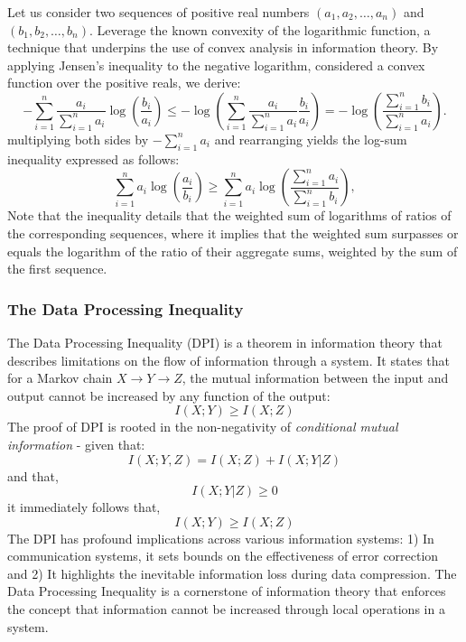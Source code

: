 \documentclass[12pt]{article}
\begin{document}
		Let us consider two sequences of positive real numbers \((a_1, a_2, \ldots, a_n)\) and \((b_1, b_2, \ldots, b_n)\). Leverage the known convexity of the logarithmic function, a technique that underpins the use of convex analysis in information theory. By applying Jensen's inequality to the negative logarithm, considered a convex function over the positive reals, we derive:
		\begin{equation}
			-\sum_{i=1}^{n} \frac{a_i}{\sum_{i=1}^{n} a_i} \log\left(\frac{b_i}{a_i}\right) \leq -\log\left(\sum_{i=1}^{n} \frac{a_i}{\sum_{i=1}^{n} a_i} \frac{b_i}{a_i}\right) = -\log\left(\frac{\sum_{i=1}^{n} b_i}{\sum_{i=1}^{n} a_i}\right).
		\end{equation}
		multiplying both sides by \(-\sum_{i=1}^{n} a_i \) and rearranging yields the log-sum inequality expressed as follows:
		\begin{equation}
			\sum_{i=1}^{n} a_i \log\left(\frac{a_i}{b_i}\right) \geq  \sum_{i=1}^{n} a_i \log\left(\frac{ \sum_{i=1}^{n} a_i}{ \sum_{i=1}^{n} b_i}\right),
		\end{equation}
		Note that the inequality details that the weighted sum of logarithms of ratios of the corresponding sequences, where it implies that the weighted sum surpasses or equals the logarithm of the ratio of their aggregate sums, weighted by the sum of the first sequence. 
		\subsubsection{The Data Processing Inequality}
		The Data Processing Inequality (DPI) is a  theorem in information theory that describes limitations on the flow of information through a system. It states that for a Markov chain \(X \rightarrow Y \rightarrow Z\), the mutual information between the input and output cannot be increased by any function of the output:
		\[ I(X; Y) \geq I(X; Z) \]
		The proof of DPI is rooted in the non-negativity of \emph{conditional mutual information} - given that:
		\begin{equation}
			I(X; Y, Z) = I(X; Z) + I(X; Y | Z) 
		\end{equation}
		and that,
		\begin{equation}
			I(X; Y | Z) \geq 0
		\end{equation}
		it immediately follows that,
		\begin{equation}
			I(X; Y) \geq I(X; Z)
		\end{equation} 
		The DPI has profound implications across various information systems: 1) In communication systems, it sets bounds on the effectiveness of error correction and 2) It highlights the inevitable information loss during data compression. The Data Processing Inequality is a cornerstone of information theory that enforces the concept that information cannot be increased through local operations in a system.
		
\end{document}
